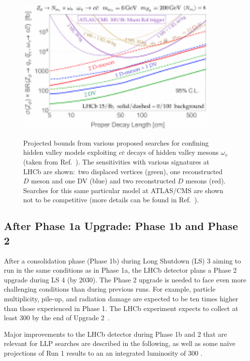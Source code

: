 \begin{figure}[t]
  \centering
  {\includegraphics[width=0.9\textwidth]{figures/lhcb_hvlimits2.pdf}}
  \caption{Projected bounds from various proposed searches for confining hidden valley models exploiting $c\bar{c}$ decays of hidden valley mesons $\omega_v$ (taken from Ref.~\cite{Pierce:2017taw}). The sensitivities with various signatures at LHCb are shown:~two displaced vertices (green), one reconstructed $D$ meson and one DV (blue) and two reconstructed $D$ mesons (red). Searches for this same particular model at ATLAS/CMS are shown not to be competitive (more details can be found in Ref.~\cite{Pierce:2017taw}).}
  \label{fig:HVlim}
\end{figure}

\subsection{After Phase 1a Upgrade: Phase 1b and Phase 2}
\label{sec:ulhcbphaseii}

After a consolidation phase (Phase 1b) during Long Shutdown (LS) 3 aiming to run in the same conditions as in Phase 1a, the LHCb detector plans a Phase 2 upgrade during LS 4 (by 2030). The Phase 2 upgrade is needed to face even more challenging conditions than during previous runs. For example, particle multiplicity, pile-up, and radiation damage are expected to be ten times higher than those experienced in Phase 1. The LHCb experiment expects to collect at least 300 \invfb by the end of Upgrade 2~\cite{LHCbUpgradeIIPC}.

Major improvements to the LHCb detector during Phase 1b and 2 that are relevant for LLP searches are described in the following, as well as some na\"ive projections of Run 1 results to an an integrated luminosity of 300 \invfb.



